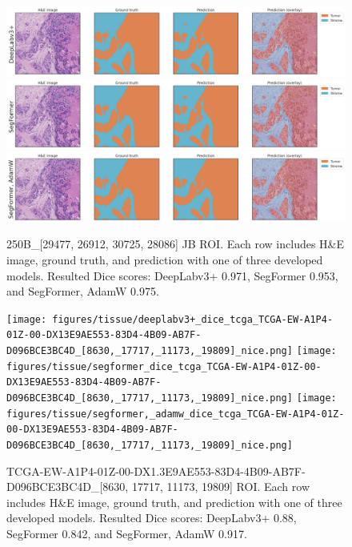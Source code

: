 \begin{figure}[H]
\includegraphics[width=\linewidth]{figures/tissue/deeplabv3+_dice_s_250B_[29477,_26912,_30725,_28086]_nice.png}
\includegraphics[width=\linewidth]{figures/tissue/segformer_dice_s_250B_[29477,_26912,_30725,_28086]_nice.png}
\includegraphics[width=\linewidth]{figures/tissue/segformer,_adamw_dice_s_250B_[29477,_26912,_30725,_28086]_nice.png}

\caption{250B\_[29477, 26912, 30725, 28086] JB ROI. 
Each row includes H\&E image, ground truth, and prediction with one of three developed models.
Resulted Dice scores: DeepLabv3+ 0.971, SegFormer 0.953, and SegFormer, AdamW 0.975.}
\label{fig:s_250B_2}
\end{figure}

\begin{figure}[H]
\texttt{[image: figures/tissue/deeplabv3+\_dice\_tcga\_TCGA-EW-A1P4-01Z-00-DX13E9AE553-83D4-4B09-AB7F-D096BCE3BC4D\_[8630,\_17717,\_11173,\_19809]\_nice.png]}
\texttt{[image: figures/tissue/segformer\_dice\_tcga\_TCGA-EW-A1P4-01Z-00-DX13E9AE553-83D4-4B09-AB7F-D096BCE3BC4D\_[8630,\_17717,\_11173,\_19809]\_nice.png]}
\texttt{[image: figures/tissue/segformer,\_adamw\_dice\_tcga\_TCGA-EW-A1P4-01Z-00-DX13E9AE553-83D4-4B09-AB7F-D096BCE3BC4D\_[8630,\_17717,\_11173,\_19809]\_nice.png]}

\caption{TCGA-EW-A1P4-01Z-00-DX1.3E9AE553-83D4-4B09-AB7F-D096BCE3BC4D\_[8630, 17717, 11173, 19809] ROI. 
Each row includes H\&E image, ground truth, and prediction with one of three developed models.
Resulted Dice scores: DeepLabv3+ 0.88, SegFormer 0.842, and SegFormer, AdamW 0.917.}
\label{fig:TCGA-EW-A1P4}
\end{figure}



